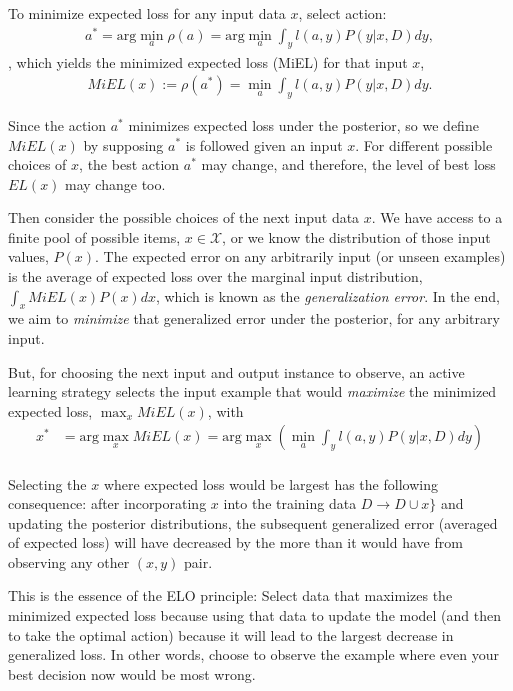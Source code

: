\documentclass[a4paper,12pt]{article}
\begin{document}
To minimize expected loss for any input data $x$, select action:
\begin{align}
a^{*} = \text{arg}\min_a \rho(a) = \text{arg}\min_a \int_y l(a,y) P(y|x,D) dy,
\end{align},
which yields the minimized expected loss (MiEL) for that input $x$,
\begin{align}
MiEL(x) := \rho(a^{*}) = \min_a \int_y l(a,y) P(y|x,D) dy .
\end{align}


Since the action $a^{*}$ minimizes expected loss under the posterior, so we define $MiEL(x)$ by supposing $a^{*}$ is followed given an input $x$. For different possible choices of $x$, the best action $a^{*}$ may change, and therefore, the level of best loss $EL(x)$ may change too. 

Then consider the possible choices of the next input data $x$. We have access to a finite pool of possible items, $x \in \mathcal{X}$, or we know the distribution of those input values, $P(x)$. The expected error on any arbitrarily input (or unseen examples) is the average of expected loss over the marginal input distribution, $\int_x MiEL(x)P(x)dx$, which is known as the \emph{generalization error}. In the end, we aim to \emph{minimize} that generalized error under the posterior, for any arbitrary input.  

But, for choosing the next input and output instance to observe, an active learning strategy selects the input example that would \emph{maximize} the minimized expected loss, $\max_x MiEL(x)$, with 
\begin{align}
x^{*}  &= \text{arg}\max_x MiEL(x) = \text{arg}\max_{x} \left( \min_{a} \int_y l(a,y) P(y|x,D) dy \right) \\
\end{align}

Selecting the $x$ where expected loss would be largest has the following consequence: after incorporating $x$ into the training data $D \to D \cup x \}$ and updating the posterior distributions, the subsequent generalized error (averaged of expected loss) will have decreased by the more than it would have from observing any other $(x,y)$ pair.

This is the essence of the ELO principle: Select data that maximizes the minimized expected loss because using that data to update the model (and then to take the optimal action) because it will lead to the largest decrease in generalized loss. In other words, choose to observe the example where even your best decision now would be most wrong. 
\end{document}
